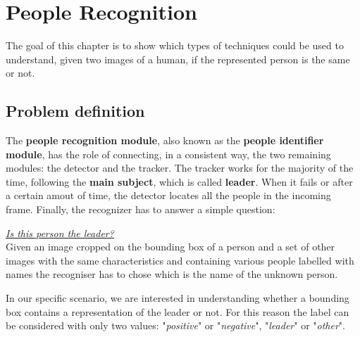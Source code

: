 \chapter{People Recognition} \label{cha:recognition}
The goal of this chapter is to show which types of techniques could be used to understand, given two images of a human, if the represented person is the same or not.

\section{Problem definition}
The \textbf{people recognition module}, also known as the \textbf{people identifier module}, has the role of connecting, in a consistent way, the two remaining modules: the detector and the tracker. The tracker works for the majority of the time, following the \textbf{main subject}, which is called \textbf{leader}. When it fails or after a certain amout of time, the detector locates all the people in the incoming frame. Finally, the recognizer has to answer a simple question:
\begin{tcolorbox}
	\begin{center}
		\underline{\textit{Is this person the leader?}}\\
		Given an image cropped on the bounding box of a person and a set of other images with the same characteristics and containing various people labelled with names the recogniser has to chose which is the name of the unknown person.
	\end{center}
\end{tcolorbox}
In our specific scenario, we are interested in understanding whether a bounding box contains a representation of the leader or not. For this reason the label can be considered with only two values: "\textit{positive}" or "\textit{negative}", "\textit{leader}" or "\textit{other}".\\

